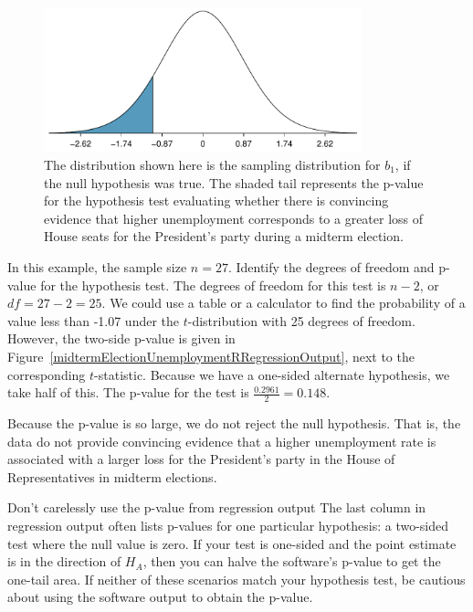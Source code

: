 \begin{figure}
\centering
\includegraphics[width=0.82\textwidth]{ch_regr_simple_linear/figures/oneSidedTailForMidtermUnemploymentHT/oneSidedTailForMidtermUnemploymentHT}
\caption{The distribution shown here is the sampling distribution for $b_1$, if the null hypothesis was true. The shaded tail represents the p-value for the hypothesis test evaluating whether there is convincing evidence that higher unemployment corresponds to a greater loss of House seats for the President's party during a midterm election.}
\label{oneSidedTailForMidtermUnemploymentHT}
\end{figure}

\begin{examplewrap}
\begin{nexample}{In this example, the sample size $n=27$. Identify the degrees of freedom and p-value for the hypothesis test.}
The degrees of freedom for this test is $n-2$, or $df = 27-2 = 25$. We could use a table or a calculator to find the probability of a value less than -1.07 under the $t$-distribution with 25 degrees of freedom.  However, the two-side p-value is given in Figure~\ref{midtermElectionUnemploymentRRegressionOutput}, next to the corresponding $t$-statistic.  Because we have a one-sided alternate hypothesis, we take half of this.  The p-value for the test is $\frac{0.2961}{2}=0.148$.  
\end{nexample}
\end{examplewrap}

\D{\newpage}

Because the p-value is so large, we do not reject the null hypothesis. That is, the data do not provide convincing evidence that a higher unemployment rate is associated with a larger loss for the President's party in the House of Representatives in midterm elections.


\begin{onebox}{Don't carelessly use the p-value from regression output}
{The last column in regression output often lists p-values for one particular hypothesis: a two-sided test where the null value is zero. If your test is one-sided and the point estimate is in the direction of $H_A$, then you can halve the software's p-value to get the one-tail area. If neither of these scenarios match your hypothesis test, be cautious about using the software output to obtain the p-value.}
\end{onebox}




